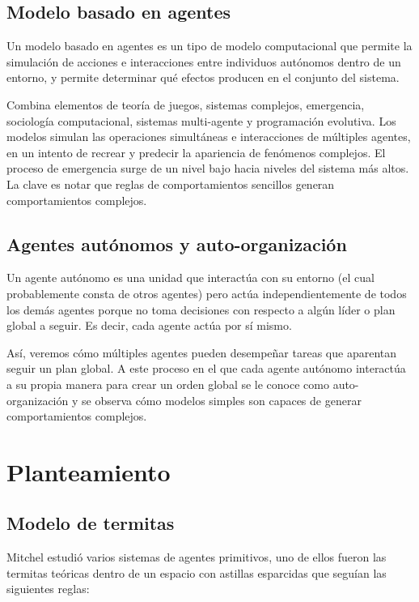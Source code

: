 \subsection{Modelo basado en agentes}
Un modelo basado en agentes es un tipo de modelo computacional que permite la simulación de acciones e interacciones entre individuos autónomos dentro de un entorno, y permite determinar qué efectos producen en el conjunto del sistema.\par

Combina elementos de teoría de juegos, sistemas complejos, emergencia, sociología computacional, sistemas multi-agente y programación evolutiva.
Los modelos simulan las operaciones simultáneas e interacciones de múltiples agentes, en un intento de recrear y predecir la apariencia de fenómenos complejos. El proceso de emergencia surge de un nivel bajo hacia niveles del sistema más altos. La clave es notar que reglas de comportamientos sencillos generan comportamientos complejos.\par

\subsection{Agentes aut\'onomos y auto-organizaci\'on}
Un agente autónomo es una unidad que interactúa con su entorno (el cual probablemente consta de otros agentes) pero actúa independientemente de todos los demás agentes porque no toma decisiones con respecto a algún líder o plan global a seguir. Es decir, cada agente actúa por sí mismo.\par

Así, veremos cómo múltiples agentes pueden desempeñar tareas que aparentan seguir un plan global. A este proceso en el que cada agente autónomo interactúa a su propia manera para crear un orden global se le conoce como auto-organización y se observa cómo modelos simples son capaces de generar comportamientos complejos.\par

\section{Planteamiento}

\subsection{Modelo de termitas}
Mitchel \cite{Resnick1994} estudió varios sistemas de agentes primitivos, uno de ellos fueron las termitas teóricas dentro de un espacio con astillas esparcidas que seguían las siguientes reglas:

